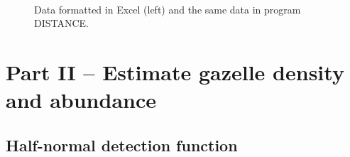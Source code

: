 \documentclass[12pt]{article}
\begin{document}
\begin{figure}[h!]
  \centering
   \hfill
     \\
  \caption{\small Data formatted in Excel (left) and the same data in
    program DISTANCE.} 
  \label{fig:ds-data}
\end{figure}



\clearpage

\section*{\large  Part II -- Estimate gazelle density and abundance}

\subsection*{\normalsize Half-normal detection function}
\end{document}
